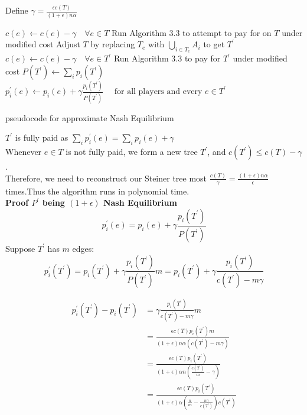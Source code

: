 \documentclass[11pt]{article}
\begin{document}
Define $\gamma = \frac{\epsilon c(T)}{(1+\epsilon)n\alpha}$
    \begin{algorithm}[H]
        \begin{algorithmic}[2]
            \STATE $c(e) \gets  c(e) -\gamma \quad \forall e \in T$
            \STATE Run Algorithm 3.3 to attempt to pay for on $T$ under modified cost
            \STATE  Adjust \( T\) by replacing \(T_e\) with  \(\bigcup_{i\in T_e} A_i\) to get \(T^{'}\)
            \STATE $c(e) \gets  c(e) -\gamma \quad \forall e \in T^{'}$
            \STATE Run Algorithm 3.3 to pay for $T^{'}$ under modified cost
            \STATE $P(T^{'}) \gets \sum_i p_i(T^{'})$
            \STATE $p_i^{'}(e) \gets p_i(e) + \gamma\frac{p_i(T^{'})}{P(T^{'})}\quad \text{ for all players and every } e \in T^{'}$
            \ENDIF
            \ENDWHILE
        \end{algorithmic}
        \caption{pseudocode for approximate Nash Equilibrium }
        \end{algorithm}

    $T^{'}$ is fully paid as $\sum_i p_i^{'}(e) = \sum_i p_i(e) + \gamma$\\
   

    Whenever \( e \in T \) is not fully paid, we form a new tree $T^{'}$, and $c(T^{'}) \leq c(T) - \gamma $.\\
    Therefore, we need to reconstruct our Steiner tree most  $\frac{c(T)}{\gamma} = \frac{(1+\epsilon)n\alpha }{\epsilon}$ times.Thus the algorithm runs in polynomial time.\\

    \textbf{Proof $P^{'}$ being $(1+\epsilon)$ Nash Equilibrium}
    \[p_i^{'}(e) = p_i(e) + \gamma\frac{p_i(T^{'})}{P(T^{'})}\]
    \vspace{10pt}
    Suppose $T^{'}$ has $m$ edges:
    \[p_i^{'}(T^{'}) = p_i(T^{'}) + \gamma\frac{p_i(T^{'})}{P(T^{'})}m = p_i(T^{'}) + \gamma\frac{p_i(T^{'})}{c(T^{'}) - m\gamma}\]
    
    \begin{align*}
    p_i^{'}(T^{'}) - p_i(T^{'}) &=  \gamma\frac{p_i(T^{'})}{c(T^{'}) - m\gamma}m\\  &= \frac{\epsilon c(T) p_i(T^{'}) m }{(1+\epsilon)n\alpha(c(T^{'}) - m\gamma)}  \\ &=  \frac{\epsilon c(T) p_i(T^{'})}{(1+\epsilon)\alpha n(\frac{c(T^{'})}{m} - \gamma)} \\ &=  \frac{\epsilon c(T) p_i(T^{'})}{(1+\epsilon)\alpha (\frac{n}{m} - \frac{n\gamma}{c(T^{'})})c(T^{'})} 
    \end{align*}
\end{document}
